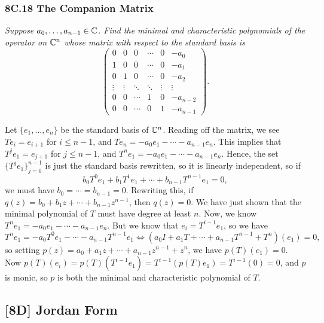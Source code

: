 \documentclass{article}
\begin{document}
\subsubsection*{8C.18 The Companion Matrix}
\textit{Suppose $a_0, \ldots, a_{n-1}\in\mathbb C$. Find the minimal and characteristic polynomials of the operator on $\mathbb C^n$ whose matrix with respect to the standard basis is
$$\begin{pmatrix}
0 & 0& 0&\cdots &0& -a_0 \\
1 & 0 &0  &\cdots &0& -a_1 \\
0 & 1 &0  &\cdots &0 &-a_2 \\
\vdots & \vdots & \ddots & \ddots & \vdots & \vdots \\
0 &0 &\cdots & 1 &0& -a_{n-2} \\
0&0 &\cdots & 0 &1& -a_{n-1}
\end{pmatrix}.$$}
\begin{solution}
Let $\{e_1, \ldots, e_n\}$ be the standard basis of $\mathbb C^n$. Reading off the matrix, we see $Te_i = e_{i+1}$ for $i \leq n-1$, and $Te_n = -a_0e_1 - \cdots - a_{n-1}e_n$. This implies that $T^je_1 = e_{j+1}$ for $j\leq n-1$, and $T^ne_1 = -a_0e_1 - \cdots - a_{n-1}e_n$. Hence, the set $\{T^je_1\}_{j=0}^{n-1}$ is just the standard basis rewritten, so it is linearly independent, so if
$$b_0T^0e_1 + b_1T^1e_1 + \cdots + b_{n-1}T^{n-1}e_1 = 0,$$
we must have $b_0 = \cdots = b_{n-1} = 0$. Rewriting this, if $q(z) = b_0 + b_1z + \cdots + b_{n-1}z^{n-1}$, then $q(z) = 0$. We have just shown that the minimal polynomial of $T$ must have degree at least $n$. Now, we know $T^ne_1 = -a_0e_1 - \cdots - a_{n-1}e_n$. But we know that $e_i = T^{i-1}e_1$, so we have
$$T^{n}e_1 = -a_0T^0e_1 - \cdots - a_{n-1}T^{n-1}e_1 \iff (a_0I + a_1T + \cdots + a_{n-1}T^{n-1}+T^n)(e_1) = 0,$$
so setting $\boxed{p(z) = a_0 + a_1z+\cdots + a_{n-1}z^{n-1} + z^n}$, we have $p(T)(e_1) = 0$. Now $p(T)(e_i) = p(T)(T^{i-1}e_1) = T^{i-1}(p(T)e_1) = T^{i-1}(0) = 0$, and $p$ is monic, so $p$ is both the minimal and characteristic polynomial of $T$.
\end{solution}
\newpage
\subsection*{[8D] Jordan Form}
\end{document}
